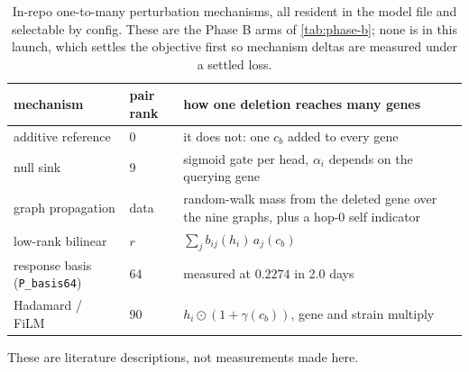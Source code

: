 \begin{table}[htbp]
\centering\small
\begin{tabular}{llp{62mm}}
\toprule
mechanism & pair rank & how one deletion reaches many genes \\
\midrule
additive reference & 0 & it does not: one $c_b$ added to every gene \\
null sink & 9 & sigmoid gate per head, $\alpha_i$ depends on the querying gene \\
graph propagation & data & random-walk mass from the deleted gene over the nine graphs, plus a hop-0 self indicator \\
low-rank bilinear & $r$ & $\sum_j b_{ij}(h_i)\, a_j(c_b)$ \\
response basis (\texttt{P\_basis64}) & 64 & measured at $0.2274$ in 2.0 days \\
Hadamard / FiLM & 90 & $h_i \odot (1 + \gamma(c_b))$, gene and strain multiply \\
\bottomrule
\end{tabular}
\caption[]{In-repo one-to-many perturbation mechanisms, all resident in the model file and
selectable by config. These are the Phase B arms of \cref{tab:phase-b}; none is in this
launch, which settles the objective first so mechanism deltas are measured under a settled
loss.}
\label{tab:launch-pair-mechanisms}
\end{table}

 These are literature
descriptions, not measurements made here.

